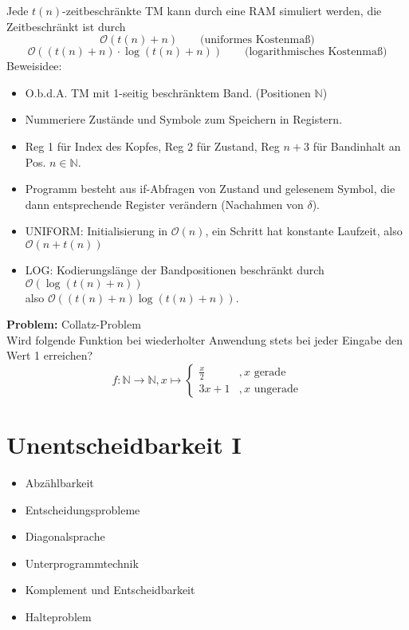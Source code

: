 \documentclass[a4paper,graphics,11pt]{article}
\begin{document}
Jede $t(n)$-zeitbeschränkte TM kann durch eine RAM simuliert werden,
die Zeitbeschränkt ist durch
$$
    \mathcal{O}(t(n)+n)\qquad \text{(uniformes Kostenmaß)}
$$$$
    \mathcal{O}((t(n)+n)\cdot \log(t(n)+n))
    \qquad \text{(logarithmisches Kostenmaß)}
$$
Beweisidee:
\begin{itemize}
    \item O.b.d.A. TM mit 1-seitig beschränktem Band. (Positionen $\mathbb{N}$)
    \item Nummeriere Zustände und Symbole zum Speichern in Registern.
    \item Reg 1 für Index des Kopfes, Reg 2 für Zustand,
        Reg $n+3$ für Bandinhalt an Pos. $n \in \mathbb{N}$.
    \item Programm besteht aus if-Abfragen von Zustand und gelesenem Symbol, die
        dann entsprechende Register verändern (Nachahmen von $\delta$).
    \item UNIFORM: Initialisierung in $\mathcal{O}(n)$, ein Schritt hat konstante Laufzeit,
        also $\mathcal{O}(n+t(n))$
    \item LOG: Kodierungslänge der Bandpositionen beschränkt durch $\mathcal{O}(\log(t(n)+n))$\\
        also $\mathcal{O}((t(n)+n)\log(t(n)+n))$.
\end{itemize}

\strut

\textbf{Problem:} Collatz-Problem\\
Wird folgende Funktion bei wiederholter Anwendung stets bei jeder Eingabe
den Wert 1 erreichen?
$$
    f : \mathbb{N} \to \mathbb{N}, x \mapsto
    \begin{cases}
        \frac{x}{2} &, x \text{ gerade}\\
        3x+1 &, x \text{ ungerade}
    \end{cases}
$$



\newpage



\section{Unentscheidbarkeit I}

\begin{itemize}
    \item Abzählbarkeit
    \item Entscheidungsprobleme
    \item Diagonalsprache
    \item Unterprogrammtechnik
    \item Komplement und Entscheidbarkeit
    \item Halteproblem
\end{itemize}
\end{document}
